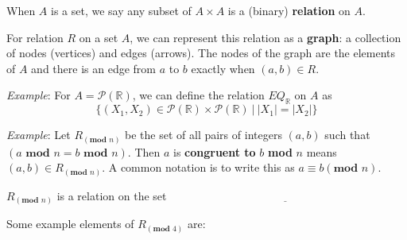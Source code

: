 \documentclass[12pt, oneside]{article}
\begin{document}
When $A$ is a set, we say any subset of $A \times A$ is a (binary) {\bf relation} on $A$.

 \vfill


For relation $R$ on a set $A$, we can represent this relation as a
{\bf graph}: a collection of nodes (vertices) and edges (arrows). The 
nodes of the graph are the elements of $A$ and 
there is an edge from $a$ to $b$ exactly when $(a,b) \in R$.
 \vfill
\newpage


{\it Example}: For $A = \mathcal{P}(\mathbb{R})$, we can define the relation $EQ_{\mathbb{R}}$ on $A$ as 
\[
\{ (X_1, X_2 ) \in\mathcal{P}(\mathbb{R})  \times \mathcal{P}(\mathbb{R}) ~|~ |X_1| = |X_2| \}
\]

\vfill

{\it Example}: Let $R_{(\textbf{mod } n)}$ be the set of all pairs of integers $(a, b)$ such that $(a \textbf{ mod } n = b \textbf{ mod } n)$.
Then $a$ is {\bf congruent to} $b$ \textbf{mod} $n$ means $(a, b) \in R_{(\textbf{mod } n)}$. A common notation is to write this as $a \equiv b (\textbf{mod } n)$.


$R_{(\textbf{mod } n)}$ is a relation on the set $\underline{\phantom{\mathbb{Z}}\hspace{20em}}$


Some example elements of $R_{(\textbf{mod } 4)}$ are: 

\vfill 
\end{document}

